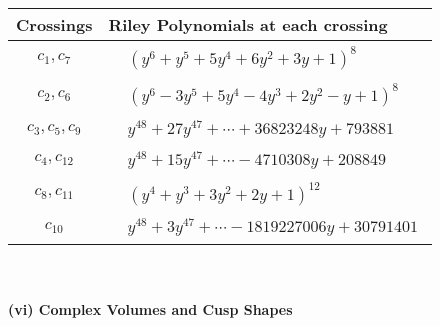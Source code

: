 \documentclass[1p]{elsarticle_modified}
\theoremstyle{definition}
\begin{document}
\begin{tabular}{m{50pt}|m{274pt}}
Crossings & \hspace{64pt}Riley Polynomials at each crossing \\
\hline $$\begin{aligned}c_{1},c_{7}\end{aligned}$$&$\begin{aligned}
&(y^6+y^5+5 y^4+6 y^2+3 y+1)^8
\end{aligned}$\\
\hline $$\begin{aligned}c_{2},c_{6}\end{aligned}$$&$\begin{aligned}
&(y^6-3 y^5+5 y^4-4 y^3+2 y^2- y+1)^8
\end{aligned}$\\
\hline $$\begin{aligned}c_{3},c_{5},c_{9}\end{aligned}$$&$\begin{aligned}
&y^{48}+27 y^{47}+\cdots+36823248 y+793881
\end{aligned}$\\
\hline $$\begin{aligned}c_{4},c_{12}\end{aligned}$$&$\begin{aligned}
&y^{48}+15 y^{47}+\cdots-4710308 y+208849
\end{aligned}$\\
\hline $$\begin{aligned}c_{8},c_{11}\end{aligned}$$&$\begin{aligned}
&(y^4+y^3+3 y^2+2 y+1)^{12}
\end{aligned}$\\
\hline $$\begin{aligned}c_{10}\end{aligned}$$&$\begin{aligned}
&y^{48}+3 y^{47}+\cdots-1819227006 y+30791401
\end{aligned}$\\
\hline
\end{tabular}\\~\\
\newpage\flushleft \textbf{(vi) Complex Volumes and Cusp Shapes}
\end{document}
